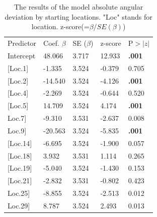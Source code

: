\begin{longtable}{p{4cm}p{2cm}p{2cm}p{2cm}l}
	\hiderowcolors
	\caption[Absolute angular deviation by starting locations]{The results of the model absolute angular deviation by starting locations. "Loc" stands for location. z-score(=$\beta/SE(\beta)$)} \\ [5ex]
	

	\hline \hline 
	\multicolumn{1}{l}{Predictor} & \multicolumn{1}{l}{Coef. $\beta$} & \multicolumn{1}{l}{SE ($\beta$)} & \multicolumn{1}{l}{z-score} & \multicolumn{1}{r}{P$>|z|$} \\
	\hline \hline
	\showrowcolors
	Intercept    & 48.066  & 3.717 & 12.933 & \textbf{\boldmath{\textless}.001} \\
	{[}Loc.1{]}  & -1.335  & 3.524 & -0.379 & 0.705 \\
	\setrow{\bfseries} {[}Loc.2{]}  & \setrow{\bfseries} -14.540 & \setrow{\bfseries} 3.524 & \setrow{\bfseries} -4.126 & \textbf{\boldmath{\textless}.001}  \\
	{[}Loc.4{]}  & -2.269  & 3.524 & -0.644 & 0.520 \\
	\setrow{\bfseries} {[}Loc.5{]}  & \setrow{\bfseries} 14.709  & \setrow{\bfseries} 3.524 & \setrow{\bfseries} 4.174  & \setrow{\bfseries} \textbf{\boldmath{\textless}.001}  \\
	 \setrow{\bfseries}{[}Loc.7{]}  & \setrow{\bfseries} -9.310  & \setrow{\bfseries} 3.531 & \setrow{\bfseries} -2.637 & \setrow{\bfseries} 0.008   \\
	 \setrow{\bfseries}{[}Loc.9{]}  & \setrow{\bfseries} -20.563 & \setrow{\bfseries} 3.524 & \setrow{\bfseries} -5.835 & \setrow{\bfseries} \textbf{\boldmath{\textless}.001}  \\
	{[}Loc.14{]} & -6.695  & 3.524 & -1.900 & 0.057 \\
	{[}Loc.18{]} & 3.932   & 3.531 & 1.114  & 0.265 \\
	{[}Loc.19{]} & -5.040  & 3.524 & -1.430 & 0.153 \\
	{[}Loc.21{]} & -2.832  & 3.531 & -0.802 & 0.423 \\
	 \setrow{\bfseries}{[}Loc.25{]} & \setrow{\bfseries} -8.855  & \setrow{\bfseries} 3.524 & \setrow{\bfseries} -2.513 & \setrow{\bfseries} 0.012   \\
	 \setrow{\bfseries}{[}Loc.29{]} & \setrow{\bfseries} 8.787   & \setrow{\bfseries} 3.524 & \setrow{\bfseries} 2.493  & \setrow{\bfseries} 0.013   \\

\end{longtable}
